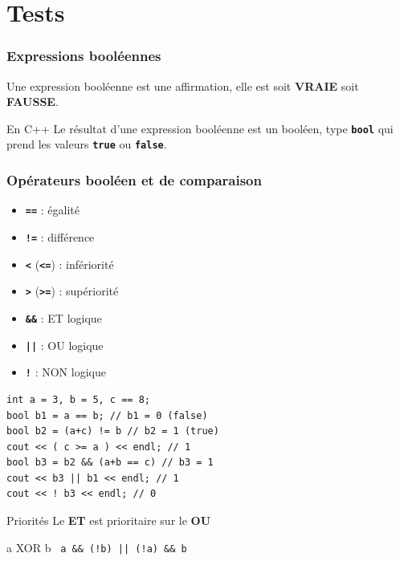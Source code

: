 \section{Tests}

\begin{frame}
	\frametitle{Expressions booléennes}
	Une expression booléenne est une affirmation, elle est soit \textbf{VRAIE} soit \textbf{FAUSSE}.
	\vfill
	\begin{block}{En C++}
		Le résultat d'une expression booléenne est un booléen, type \texttt{\textbf{bool}} qui prend les valeurs \texttt{\textbf{true}} ou \texttt{\textbf{false}}.
	\end{block}

\end{frame}

\begin{frame}[fragile]
	\frametitle{Opérateurs booléen et de comparaison}
	\begin{minipage}{0.43\linewidth}
		\begin{itemize}
			\item \texttt{\textbf{==}} : égalité
			\item \texttt{\textbf{!=}} : différence
			\item \texttt{\textbf{<}} (\texttt{\textbf{<=}}) : infériorité
			\item \texttt{\textbf{>}} (\texttt{\textbf{>=}}) : supériorité
			\item \texttt{\textbf{\&\&}} : ET logique
			\item \texttt{\textbf{||}} : OU logique
			\item \texttt{\textbf{!}} : NON logique
		\end{itemize}
	\end{minipage}
	\hfill
	\begin{minipage}{0.53\linewidth}
		\begin{verbatim}
int a = 3, b = 5, c == 8;
bool b1 = a == b; // b1 = 0 (false)
bool b2 = (a+c) != b // b2 = 1 (true)
cout << ( c >= a ) << endl; // 1
bool b3 = b2 && (a+b == c) // b3 = 1
cout << b3 || b1 << endl; // 1
cout << ! b3 << endl; // 0
		\end{verbatim}
	\end{minipage}
	\begin{block}{Priorités}
		Le \textbf{ET} est prioritaire sur le \textbf{OU}
	\end{block}

	\begin{block}{a XOR b}
		\centering
		\texttt{ a \&\& (!b) || (!a) \&\& b }
	\end{block}

\end{frame}

